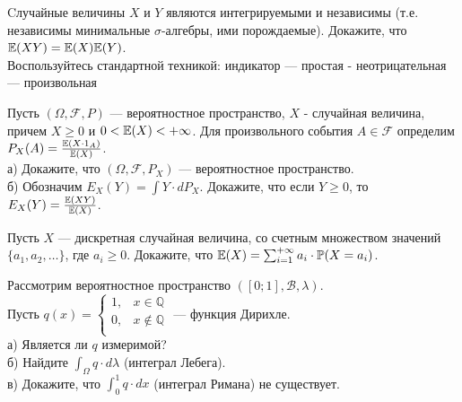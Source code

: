 \begin{problem}
Cлучайные величины $X$ и $Y$ являются интегрируемыми и независимы
(т.е. независимы минимальные $\sigma$-алгебры, ими
порождаемые). Докажите, что $\mathbb{E}(XY)=\mathbb{E}(X)\mathbb{E}(Y)$. \\
Воспользуйтесь стандартной техникой: индикатор --- простая -
неотрицательная --- произвольная
\end{problem} 
\begin{solution} 

\end{solution}

\begin{problem}
Пусть $(\Omega,\mathcal{F},P)$ --- вероятностное пространство, $X$ -
случайная величина, причем $X\ge 0$ и $0<\mathbb{E}(X)< + \infty$. Для
произвольного события $A\in\mathcal{F}$ определим
$P_{X}(A)=\frac{\mathbb{E}(X\cdot 1_{A})}{\mathbb{E}(X)}$. \\
а) Докажите, что $(\Omega,\mathcal{F},P_{X})$ --- вероятностное пространство. \\
б) Обозначим $E_{X}(Y)=\int Y \cdot dP_{X}$. Докажите, что
если $Y\ge 0$, то $E_{X}(Y)=\frac{\mathbb{E}(XY)}{\mathbb{E}(X)}$. 
\end{problem} 
\begin{solution} 

\end{solution}

\begin{problem}
Пусть $X$ --- дискретная случайная величина, со счетным множеством
значений $\{a_{1},a_{2},\ldots\}$, где $a_{i} \ge 0$. Докажите, что
$\mathbb{E}(X)=\sum_{i=1}^{+\infty} a_{i}\cdot \mathbb{P}(X=a_{i})$. 
\end{problem} 
\begin{solution} 

\end{solution}

\begin{problem}
Рассмотрим вероятностное пространство
$([0;1],\mathcal{B},\lambda)$. \\
Пусть $q(x)= 
\begin{cases}
  1, & x\in \mathbb{Q} \\
  0, & x\notin \mathbb{Q} \\
\end{cases}$ --- функция Дирихле. \\
а) Является ли $q$ измеримой? \\
б) Найдите $\int_{\Omega}q \cdot d\lambda$ (интеграл Лебега). \\
в) Докажите, что $\int_{0}^{1} q \cdot dx$ (интеграл Римана) не
существует. 
\end{problem} 
\begin{solution} 

\end{solution}

